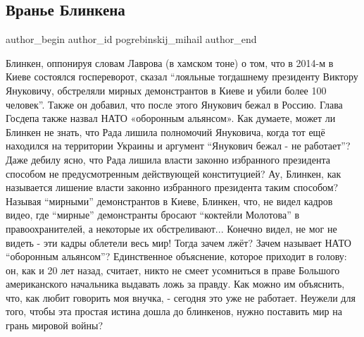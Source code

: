  
 
 
 
 
 
\subsection{Вранье Блинкена}
\label{sec:05_12_2021.fb.pogrebinskij_mihail.1.vranje_blinkena}
 
\ifcmt
 author_begin
   author_id pogrebinskij_mihail
 author_end
\fi

Блинкен, оппонируя словам Лаврова (в хамском тоне) о том, что в 2014-м в Киеве
состоялся госпереворот, сказал \enquote{лояльные тогдашнему президенту Виктору
Януковичу, обстреляли мирных демонстрантов в Киеве и убили более 100 человек}.
Также он добавил, что после этого Янукович бежал в Россию. Глава Госдепа также
назвал НАТО «оборонным альянсом». Как думаете, может ли Блинкен не знать, что
Рада лишила полномочий Януковича, когда тот ещё находился на территории Украины
и аргумент \enquote{Янукович бежал - не работает}? Даже дебилу ясно, что Рада лишила
власти законно избранного президента способом не предусмотренным действующей
конституцией? Ау, Блинкен, как называется лишение власти законно избранного
президента таким способом? Называя \enquote{мирными} демонстрантов в Киеве, Блинкен,
что, не видел кадров видео, где \enquote{мирные} демонстранты бросают \enquote{коктейли
Молотова} в правоохранителей, а некоторые их обстреливают... Конечно видел, не
мог не видеть - эти кадры облетели весь мир! Тогда зачем лжёт? Зачем называет
НАТО \enquote{оборонным альянсом}? Единственное объяснение, которое приходит в голову:
он, как и 20 лет назад, считает, никто не смеет усомниться в праве Большого
американского начальника выдавать ложь за правду. Как можно им объяснить, что,
как любит говорить моя внучка, - сегодня это уже не работает. Неужели для того,
чтобы эта простая истина дошла до блинкенов, нужно поставить мир на грань
мировой войны?

